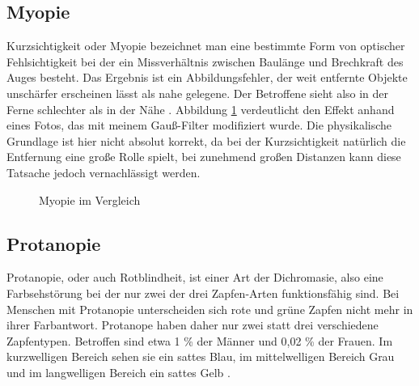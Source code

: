 \documentclass[a4paper]{article}
\begin{document}
\subsection*{Myopie}
Kurzsichtigkeit oder Myopie bezeichnet man eine bestimmte Form von optischer Fehlsichtigkeit bei der ein Missverhältnis zwischen Baulänge und Brechkraft des Auges besteht. Das Ergebnis ist ein Abbildungsfehler, der weit entfernte Objekte unschärfer erscheinen lässt als nahe gelegene. Der Betroffene sieht also in der Ferne schlechter als in der Nähe \cite{WP-KS}. Abbildung \ref{myopia} verdeutlicht den Effekt anhand eines Fotos, das mit meinem Gauß-Filter \cite{WP-GF} modifiziert wurde. Die physikalische Grundlage ist hier nicht absolut korrekt, da bei der Kurzsichtigkeit natürlich die Entfernung eine große Rolle spielt, bei zunehmend großen Distanzen kann diese Tatsache jedoch vernachlässigt werden.

\begin{figure}[H]
\centering
{}
\caption{Myopie im Vergleich}
\label{myopia}
\end{figure}

\newpage

\subsection*{Protanopie}
Protanopie, oder auch Rotblindheit, ist einer Art der Dichromasie, also eine Farbsehstörung bei der nur zwei der drei Zapfen-Arten funktionsfähig sind. Bei Menschen mit Protanopie unterscheiden sich rote und grüne Zapfen nicht mehr in ihrer Farbantwort. Protanope haben daher nur zwei statt drei verschiedene Zapfentypen. Betroffen sind etwa 1 \% der Männer und 0,02 \% der Frauen. Im kurzwelligen Bereich sehen sie ein sattes Blau, im mittelwelligen Bereich Grau und im langwelligen Bereich ein sattes Gelb \cite{WP-P}.
\end{document}
